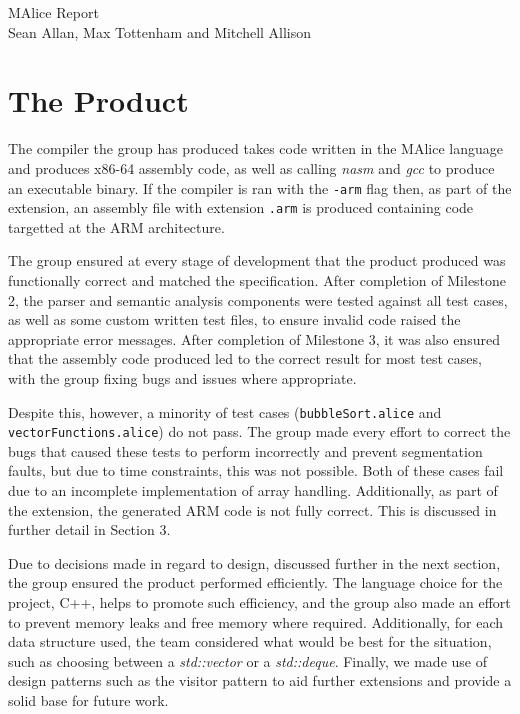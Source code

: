 \documentclass[a4wide, 11pt]{article}
\begin{document}
\begin{center}
{\huge MAlice Report} \\ [0.4cm]
{\large Sean Allan, Max Tottenham and Mitchell Allison} \\ [0.2cm]
\vspace{1cm}
\end{center}

\section{The Product}
The compiler the group has produced takes code written in the MAlice language
and produces x86-64 assembly code, as well as calling \emph{nasm} and \emph{gcc}
to produce an executable binary. If the compiler is ran with the \texttt{-arm} 
flag then, as part of the extension, an assembly file with extension 
\texttt{.arm} is produced containing code targetted at the ARM architecture.

The group ensured at every stage of development that the product produced
was functionally correct and matched the specification. After completion of
Milestone 2, the parser and semantic analysis components were tested against
all test cases, as well as some custom written test files, to ensure invalid
code raised the appropriate error messages. After completion of Milestone 3, it
was also ensured that the assembly code produced led to the correct result 
for most test cases, with the group fixing bugs and issues where appropriate.

Despite this, however, a minority of test cases 
(\texttt{bubbleSort.alice} and \texttt{vectorFunctions.alice}) do
not pass. The group made every effort to correct the bugs that caused these
tests to perform incorrectly and prevent segmentation faults, but due to time
constraints, this was not possible. Both of these cases fail due to an 
incomplete implementation of array handling. Additionally, as part of the
extension, the generated ARM code is not fully correct. This is discussed
in further detail in Section 3.

Due to decisions made in regard to design, discussed further in the next
section, the group ensured the product performed efficiently. The language
choice for the project, C++, helps to promote such efficiency, and the group
also made an effort to prevent memory leaks and free memory where required. 
Additionally, for each data structure used, the team considered what would be
best for the situation, such as choosing between a \emph{std::vector} or a
\emph{std::deque}. Finally, we made use of design patterns such as the visitor
pattern to aid further extensions and provide a solid base for future work.
\end{document}
